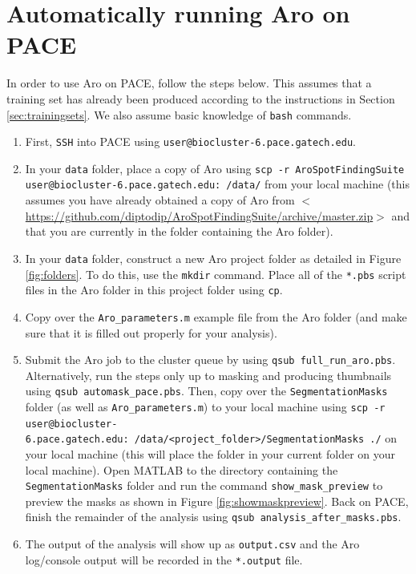 \documentclass[titlepage,11pt]{article}
\begin{document}
\section{Automatically running Aro on PACE} \label{sec:paceguide}

In order to use Aro on PACE, follow the steps below. This assumes that a training set has already been produced according to the instructions in Section \ref{sec:trainingsets}. We also assume basic knowledge of \texttt{bash} commands.
\begin{enumerate}
\item First, \texttt{SSH} into PACE using \texttt{user@biocluster-6.pace.gatech.edu}.
\item In your \texttt{data} folder, place a copy of Aro using \texttt{scp -r AroSpotFindingSuite user@biocluster-6.pace.gatech.edu:~/data/} from your local machine (this assumes you have already obtained a copy of Aro from $<$\href{https://github.com/diptodip/AroSpotFindingSuite/archive/master.zip}{https://github.com/diptodip/AroSpotFindingSuite/archive/master.zip}$>$ and that you are currently in the folder containing the Aro folder).
\item In your \texttt{data} folder, construct a new Aro project folder as detailed in Figure \ref{fig:folders}. To do this, use the \texttt{mkdir} command. Place all of the \texttt{*.pbs} script files in the Aro folder in this project folder using \texttt{cp}.
\item Copy over the \texttt{Aro\_parameters.m} example file from the Aro folder (and make sure that it is filled out properly for your analysis).
\item Submit the Aro job to the cluster queue by using \texttt{qsub full\_run\_aro.pbs}.
    \subitem Alternatively, run the steps only up to masking and producing thumbnails using \texttt{qsub automask\_pace.pbs}.
    \subitem Then, copy over the \texttt{SegmentationMasks} folder (as well as \texttt{Aro\_parameters.m}) to your local machine using \texttt{scp -r user@biocluster-6.pace.gatech.edu:~/data/<project\_folder>/SegmentationMasks ./} on your local machine (this will place the folder in your current folder on your local machine).
    \subitem Open MATLAB to the directory containing the \texttt{SegmentationMasks} folder and run the command \texttt{show\_mask\_preview} to preview the masks as shown in Figure \ref{fig:showmaskpreview}.
    \subitem Back on PACE, finish the remainder of the analysis using \texttt{qsub analysis\_after\_masks.pbs}.
\item The output of the analysis will show up as \texttt{output.csv} and the Aro log/console output will be recorded in the \texttt{*.output} file.
\end{enumerate}
\end{document}
